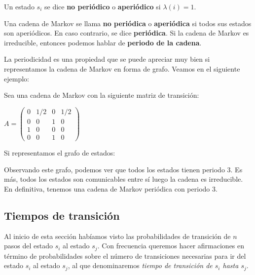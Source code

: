 \begin{definition}
Un estado $s_i$ se dice \textbf{no periódico} o \textbf{aperiódico} si $\lambda(i)=1$. 
\end{definition}
\begin{definition}
Una cadena de Markov se llama \textbf{no periódica} o \textbf{aperiódica} si todos sus estados son aperiódicos. En caso contrario, se dice \textbf{periódica}. Si la cadena de Markov es irreducible, entonces podemos hablar de \textbf{periodo de la cadena}.
\end{definition}
La periodicidad es una propiedad que se puede apreciar muy bien si representamos la cadena de Markov en forma de grafo. Veamos en el siguiente ejemplo:
\begin{exampleth}
Sea una cadena de Markov con la siguiente matriz de transición:
\begin{center}
    $A=\begin{pmatrix}
    0 & 1/2 & 0 & 1/2 \\
    0 & 0 & 1 & 0 \\
    1 & 0 & 0 & 0 \\
    0 & 0 & 1 & 0
    \end{pmatrix}$
\end{center}
Si representamos el grafo de estados:
    \begin{center}
    \end{center}
Observando este grafo, podemos ver que todos los estados tienen periodo 3. Es más, todos los estados son comunicables entre sí luego la cadena es irreducible. En definitiva, tenemos una cadena de Markov periódica con periodo 3.
\end{exampleth}

\subsection{Tiempos de transición}
Al inicio de esta sección habíamos visto las probabilidades de transición de $n$ pasos del estado $s_i$ al estado $s_j$. Con frecuencia queremos hacer afirmaciones en término de probabilidades sobre el número de transiciones necesarias para ir del estado $s_i$ al estado $s_j$, al que denominaremos \textit{tiempo de transición de $s_i$ hasta $s_j$}.

